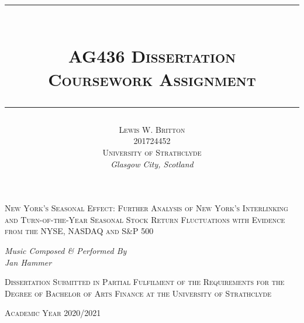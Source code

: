 \documentclass[11pt, english]{article}
\newcommand{\HRule}[1]{\rule{\linewidth}{#1}}
\begin{document}


	\title{
                \HRule{0.5pt}\\ [0.3cm]
                \huge\textsc{AG436 Dissertation}\\
                \Large\textsc{Coursework Assignment}\\ [0.25cm]
                \HRule{0.5pt}
                }

	\author{\textsc{Lewis W. Britton}\\
                \textsc{201724452}\\
                \textsc{University of Strathclyde}\\
		\textit{Glasgow City, Scotland}
                }

	\date{}
        
	\maketitle

        \begin{center}
                \textsc{New York's Seasonal Effect: Further Analysis of New York's Interlinking and Turn-of-the-Year Seasonal Stock Return Fluctuations with Evidence from the NYSE, NASDAQ and S\&P 500}
        \end{center}

        \vspace{\fill}

	\begin{center}
		\textit{Music Composed \& Performed By\\
		Jan Hammer}
	\end{center}

	\begin{center}
	\end{center}

        \begin{center}
        	\textsc{Dissertation Submitted in Partial Fulfilment of the Requirements for the Degree of Bachelor of Arts Finance at the University of Strathclyde}
        \end{center}

        \begin{center}
		\textsc{Academic Year 2020/2021}
        \end{center}

\newpage
\end{document}
